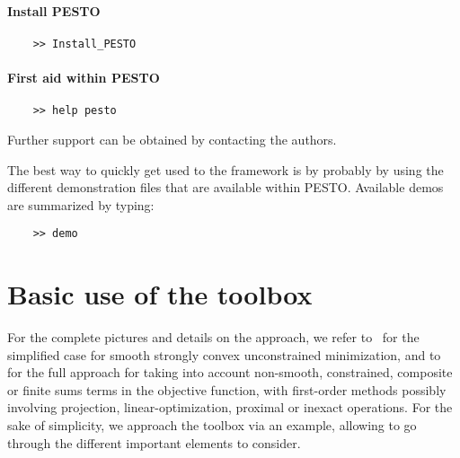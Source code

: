 \documentclass[11pt,a4paper]{article}
\newcommand{\pesto}{{PESTO }}
\begin{document}
	\paragraph{Install \pesto}
	\begin{verbatim}
	>> Install_PESTO
	\end{verbatim}

	\paragraph{First aid within \pesto}
	\begin{verbatim}
	>> help pesto
	\end{verbatim}
	Further support can be obtained by contacting the authors.

	The best way to quickly get used to the framework is by probably by using the different demonstration files that are available within PESTO. Available demos are summarized by typing:
	\begin{verbatim}
	>> demo
	\end{verbatim}

	\clearpage

	\section{Basic use of the toolbox}	%
	\label{sec:basicuse}

	For the complete pictures and details on the approach, we refer to~\cite[Section 1\&3]{taylor2015smooth} for the simplified case for smooth strongly convex unconstrained minimization, and to~\cite[Section 1\&2]{taylor2015exact} for the full approach for taking into account non-smooth, constrained, composite or finite sums terms in the objective function, with first-order methods possibly involving projection, linear-optimization, proximal or inexact operations. For the sake of simplicity, we approach the toolbox via an example, allowing to go through the different important elements to consider.
\end{document}
